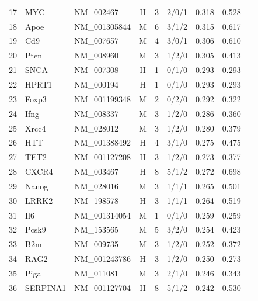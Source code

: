 \begin{table}[h]
\begin{tabular}{rllcrrrcc}
17 & MYC & NM\_002467 & H & 3 & 2/0/1 & 0.318 & 0.528 \\
18 & Apoe & NM\_001305844 & M & 6 & 3/1/2 & 0.315 & 0.617 \\
19 & Cd9 & NM\_007657 & M & 4 & 3/0/1 & 0.306 & 0.610 \\
20 & Pten & NM\_008960 & M & 3 & 1/2/0 & 0.305 & 0.413 \\
21 & SNCA & NM\_007308 & H & 1 & 0/1/0 & 0.293 & 0.293 \\
22 & HPRT1 & NM\_000194 & H & 1 & 0/1/0 & 0.293 & 0.293 \\
23 & Foxp3 & NM\_001199348 & M & 2 & 0/2/0 & 0.292 & 0.322 \\
24 & Ifng & NM\_008337 & M & 3 & 1/2/0 & 0.286 & 0.360 \\
25 & Xrcc4 & NM\_028012 & M & 3 & 1/2/0 & 0.280 & 0.379 \\
26 & HTT & NM\_001388492 & H & 4 & 3/1/0 & 0.275 & 0.475 \\
27 & TET2 & NM\_001127208 & H & 3 & 1/2/0 & 0.273 & 0.377 \\
28 & CXCR4 & NM\_003467 & H & 8 & 5/1/2 & 0.272 & 0.698 \\
29 & Nanog & NM\_028016 & M & 3 & 1/1/1 & 0.265 & 0.501 \\
30 & LRRK2 & NM\_198578 & H & 3 & 1/1/1 & 0.264 & 0.519 \\
31 & Il6 & NM\_001314054 & M & 1 & 0/1/0 & 0.259 & 0.259 \\
32 & Pcsk9 & NM\_153565 & M & 5 & 3/2/0 & 0.254 & 0.423 \\
33 & B2m & NM\_009735 & M & 3 & 1/2/0 & 0.252 & 0.372 \\
34 & RAG2 & NM\_001243786 & H & 3 & 1/2/0 & 0.250 & 0.273 \\
35 & Piga & NM\_011081 & M & 3 & 2/1/0 & 0.246 & 0.343 \\
36 & SERPINA1 & NM\_001127704 & H & 8 & 5/1/2 & 0.242 & 0.530 \\
\hline
\end{tabular}
\end{table}

